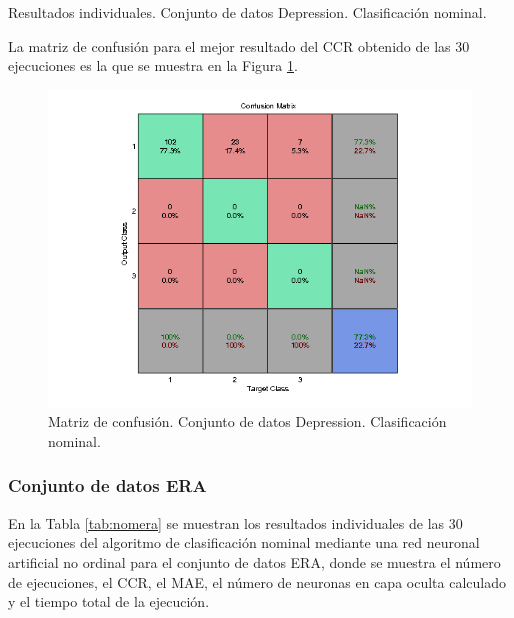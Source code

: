 			\begin{table}[!htbp]
				\centering
				\caption{Resultados individuales. Conjunto de datos Depression. Clasificación nominal.}
				\label{tab:nomdep}
			\end{table}
			
			La matriz de confusión para el mejor resultado del CCR obtenido de las 30 ejecuciones es la que se muestra en la Figura \ref{fig:nomdep}.
			
			\begin{figure}[htbp]
				\centering
				\includegraphics[scale=0.8]{../src/results/nominal/depresion_mc1.png}
				\caption{Matriz de confusión. Conjunto de datos Depression. Clasificación nominal.}
				\label{fig:nomdep}
			\end{figure}

			\subsubsection{Conjunto de datos ERA}
			
			En la Tabla \ref{tab:nomera} se muestran los resultados individuales de las 30 ejecuciones del algoritmo de clasificación nominal mediante una red neuronal artificial no ordinal para el conjunto de datos ERA, donde se muestra el número de ejecuciones, el CCR, el MAE, el número de neuronas en capa oculta calculado y el tiempo total de la ejecución.\\
			

